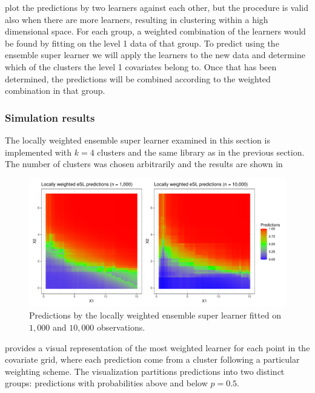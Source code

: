 \documentclass[./main.tex]{subfiles}
\begin{document}
 plot the predictions by two learners against each other, but the procedure is valid also when there are more learners, resulting in clustering within a high dimensional space. For each group, a weighted combination of the learners would be found by fitting on the level 1 data of that group. To predict using the ensemble super learner we will apply the learners to the new data and determine which of the clusters the level 1 covariates belong to. Once that has been determined, the predictions will be combined according to the weighted combination in that group. 

\subsubsection{Simulation results}
The locally weighted ensemble super learner examined in this section is implemented with $ k = 4 $ clusters and the same library as in the previous section. The number of clusters was chosen arbitrarily and the results are shown in 
\begin{figure}[H]
    \centering
    \includegraphics[width=\textwidth]{figures/esl_preds_lw.pdf}
    \caption{Predictions by the locally weighted ensemble super learner fitted on $ 1,000 $ and $ 10,000 $ observations.}
    \label{fig:esl_preds_lw}
\end{figure}
 provides a visual representation of the most weighted learner for each point in the covariate grid, where each prediction come from a cluster following a particular weighting scheme. The visualization partitions predictions into two distinct groups: predictions with probabilities above and below $p = 0.5$.
\end{document}
